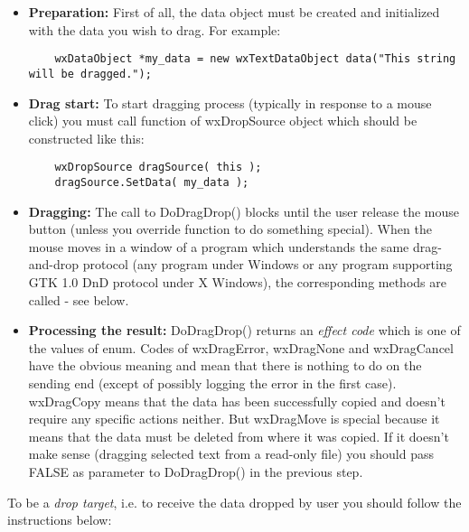 \begin{itemize}\itemsep=0pt
\item {\bf Preparation:} First of all, the data object must be created and
initialized with the data you wish to drag. For example:

\begin{verbatim}
	wxDataObject *my_data = new wxTextDataObject data("This string will be dragged.");
\end{verbatim}
\item{\bf Drag start:} To start dragging process (typically in response to a
mouse click) you must call  function
of wxDropSource object which should be constructed like this:

\begin{verbatim}
	wxDropSource dragSource( this );
	dragSource.SetData( my_data );
\end{verbatim}
\item {\bf Dragging:} The call to DoDragDrop() blocks until the user release the
mouse button (unless you override  function
to do something special). When the mouse moves in a window of a program which understands the
same drag-and-drop protocol (any program under Windows or any program supporting GTK 1.0
DnD protocol under X Windows), the corresponding  methods
are called - see below.
\item {\bf Processing the result:} DoDragDrop() returns an {\it effect code} which
is one of the values of  enum. Codes
of wxDragError, wxDragNone and wxDragCancel have the obvious meaning and mean
that there is nothing to do on the sending end (except of possibly logging the
error in the first case). wxDragCopy means that the data has been successfully
copied and doesn't require any specific actions neither. But wxDragMove is
special because it means that the data must be deleted from where it was
copied. If it doesn't make sense (dragging selected text from a read-only
file) you should pass FALSE as parameter to DoDragDrop() in the previous step.
\end{itemize}

To be a {\it drop target}, i.e. to receive the data dropped by user you should
follow the instructions below:

